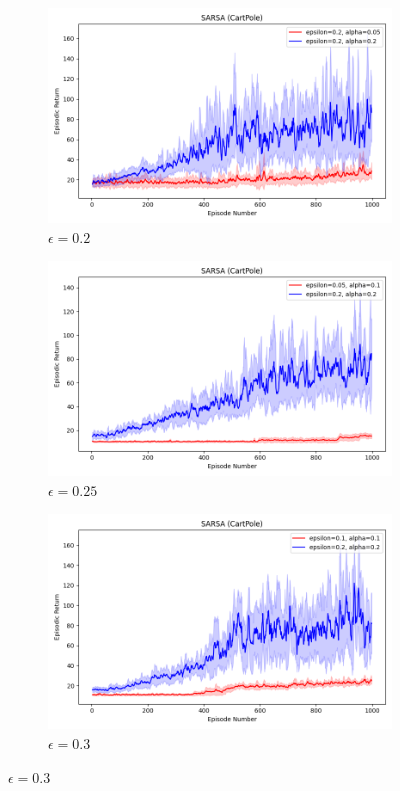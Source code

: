 \documentclass[11pt, a4]{article}
\begin{document}
\begin{figure}[h]
				\begin{subfigure}[h]{0.3\textwidth}
					\centering
					\includegraphics[width=\textwidth]{../plots/sarsa_0.05_0.2vs0.2_0.2.png}
					\caption{$\epsilon = 0.2$}
				\end{subfigure}
				\hfill
				\begin{subfigure}[h]{0.3\textwidth}
					\centering
					\includegraphics[width=\textwidth]{../plots/sarsa_0.1_0.05vs0.2_0.2.png}
					\caption{$\epsilon = 0.25$}
				\end{subfigure}
				\hfill
				\begin{subfigure}[h]{0.3\textwidth}
					\centering
					\includegraphics[width=\textwidth]{../plots/sarsa_0.1_0.1vs0.2_0.2.png}
					\caption{$\epsilon = 0.3$}
				\end{subfigure}
				

\end{figure}
\end{document}
